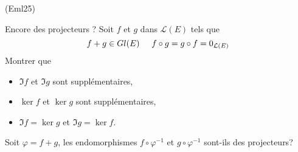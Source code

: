 \begin{tiny}(Eml25)\end{tiny} Encore des projecteurs ?\newline
Soit $f$ et $g$ dans $\mathcal{L}(E)$ tels que 
\begin{displaymath}
f+g \in Gl(E) \hspace{0.5cm} f\circ g = g\circ f =0_{\mathcal{L}(E)}  
\end{displaymath}
Montrer que 
\begin{itemize}
  \item $\Im f$ et $\Im g$ sont supplémentaires,
  \item $\ker f$ et $\ker g$ sont supplémentaires,
  \item $\Im f = \ker g $ et $\Im g = \ker f$.  
\end{itemize}

Soit $\varphi = f+g$, les endomorphismes $f\circ \varphi^{-1}$ et $g\circ \varphi^{-1}$ sont-ils des projecteurs?